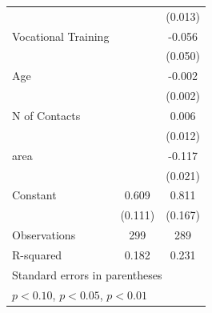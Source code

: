 {\begin{tabular}{l*{2}{c}}
                    &                     &     (0.013)         \\
\addlinespace
Vocational Training &                     &      -0.056         \\
                    &                     &     (0.050)         \\
\addlinespace
Age                 &                     &      -0.002         \\
                    &                     &     (0.002)         \\
\addlinespace
N of Contacts       &                     &       0.006         \\
                    &                     &     (0.012)         \\
\addlinespace
area                &                     &      -0.117\sym{**} \\
                    &                     &     (0.021)         \\
\addlinespace
Constant            &       0.609\sym{**} &       0.811\sym{**} \\
                    &     (0.111)         &     (0.167)         \\
\midrule
Observations        &         299         &         289         \\
R-squared           &       0.182         &       0.231         \\
\bottomrule
\multicolumn{3}{l}{\footnotesize Standard errors in parentheses}\\
\multicolumn{3}{l}{\footnotesize \sym{*} \(p<0.10\), \sym{**} \(p<0.05\), \sym{***} \(p<0.01\)}\\
\end{tabular}
}
